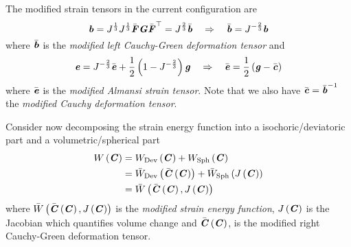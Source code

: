 The modified strain tensors in the current configuration are 
\begin{equation}
  \boldsymbol{\mathit{b}} = J^{\frac{1}{3}}J^{\frac{1}{3}}\bar{\boldsymbol{\mathit{F}}}\boldsymbol{\mathit{G}} {\bar{\boldsymbol{\mathit{F}}}}^{ \top } =J^{\frac{2}{3}}\bar{\boldsymbol{\mathit{b}}} \quad\Rightarrow\quad \bar{\boldsymbol{\mathit{b}}} =J^{-\frac{2}{3}}\boldsymbol{\mathit{b}}
\end{equation}
where $\bar{\boldsymbol{\mathit{b}}}$ is the \emph{modified left Cauchy-Green deformation
  tensor} and
\begin{equation}
  \boldsymbol{\mathit{e}} =
  J^{-\frac{2}{3}}{\bar{\boldsymbol{\mathit{e}}}}+\dfrac{1}{2}\left( 1-J^{-\frac{2}{3}} \right)\boldsymbol{\mathit{g}}
  \quad\Rightarrow\quad \bar{\boldsymbol{\mathit{e}}} = \dfrac{1}{2}\left( \boldsymbol{\mathit{g}}-\bar{\boldsymbol{\mathit{c}}} \right)
\end{equation}
where $\bar{\boldsymbol{\mathit{e}}}$ is the \emph{modified Almansi strain
  tensor}. Note that we also have
$\bar{\boldsymbol{\mathit{c}}}={\bar{\boldsymbol{\mathit{b}}}}^{-1}$ the \emph{modified Cauchy
  deformation tensor}.

Consider now decomposing the strain energy function into a
isochoric/deviatoric part and a volumetric/spherical part \ie
\begin{equation}
  \begin{split}
     W\left( \boldsymbol{\mathit{C}} \right)  &=
     W_{\operatorname{Dev}}\left( \boldsymbol{\mathit{C}} \right) + W_{\operatorname{Sph}}\left( \boldsymbol{\mathit{C}} \right)  \\
    &= \bar{W}_{\operatorname{Dev}}\left(  \bar{\boldsymbol{\mathit{C}}}\left( \boldsymbol{\mathit{C}} \right)  \right) + \bar{W}_{\operatorname{Sph}}\left(  J\left( \boldsymbol{\mathit{C}} \right)  \right) \\
    &= \bar{W}\left(  \bar{\boldsymbol{\mathit{C}}}\left( \boldsymbol{\mathit{C}} \right) , J\left( \boldsymbol{\mathit{C}} \right)  \right) 
  \end{split}
\end{equation}
where
$ \bar{W}\left(  \bar{\boldsymbol{\mathit{C}}}\left( \boldsymbol{\mathit{C}} \right) , J\left( \boldsymbol{\mathit{C}} \right)  \right) $
is the \emph{modified strain energy function}, $ J\left( \boldsymbol{\mathit{C}} \right) $ is the
Jacobian which quantifies volume change and
$ \bar{\boldsymbol{\mathit{C}}}\left( \boldsymbol{\mathit{C}} \right) $, is the modified right Cauchy-Green
deformation tensor.


